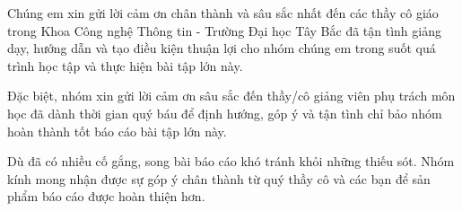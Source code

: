 \begin{acknowledgements}
  Chúng em xin gửi lời cảm ơn chân thành và sâu sắc nhất đến các thầy cô giáo trong Khoa Công nghệ Thông tin - Trường Đại học Tây Bắc đã tận tình giảng dạy, hướng dẫn và tạo điều kiện thuận lợi cho nhóm chúng em trong suốt quá trình học tập và thực hiện bài tập lớn này.

  Đặc biệt, nhóm xin gửi lời cảm ơn sâu sắc đến thầy/cô giảng viên phụ trách môn học đã dành thời gian quý báu để định hướng, góp ý và tận tình chỉ bảo nhóm hoàn thành tốt báo cáo bài tập lớn này.

  Dù đã có nhiều cố gắng, song bài báo cáo khó tránh khỏi những thiếu sót. Nhóm kính mong nhận được sự góp ý chân thành từ quý thầy cô và các bạn để sản phẩm báo cáo được hoàn thiện hơn.
\end{acknowledgements}
